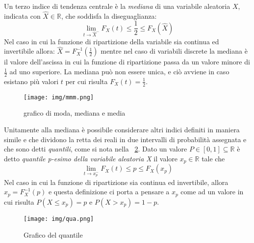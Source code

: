 \documentclass[a4paper,12pt, oneside]{book}
\newcommand{\numberset}{\mathbb}
\newcommand{\R}{\numberset{R}}
\begin{document}
Un terzo indice di tendenza centrale è la \emph{mediana}  di una variabile aleatoria $X$, 
indicata con $\hat{X} \in \R$, che soddisfa la diseguaglianza:
\[ \lim_{t \to \hat{X}^-} F_X(t) \leq \frac{1}{2} \leq F_X(\hat{X})\]
Nel caso in cui la funzione di ripartizione della variabile sia continua ed invertibile allora:
$\hat{X}=F_X^{-1}(\frac{1}{2})$ mentre nel caso di variabili discrete la mediana è il valore dell'ascissa
in cui la funzione di ripartizione passa da un valore minore di $\frac{1}{2}$ ad uno superiore.\newline
La mediana può non essere unica, e ciò avviene in caso esistano più valori $t$ per cui risulta $F_X(t) = \frac{1}{2}$.

\begin{figure}
    \centering
    \caption{grafico di moda, mediana e media}
    \label{fig:centralValue}
    \texttt{[image: img/mmm.png]}
\end{figure}
Unitamente alla mediana è possibile considerare altri indici definiti in maniera simile e che dividono
la retta dei reali in due intervalli di probabilità assegnata e che sono detti \emph{quantili}, come si nota
nella \figurename~\ref{fig:quantile}.
Dato un valore $P \in [0,1] \subseteq \R$ è detto \emph{quantile p-esimo della variabile aleatoria X} il valore
$x_p \in \R$ tale che
\[ \lim_{t \to x_p^{-}} F_X(t) \leq p \leq F_X(x_p)\]
Nel caso in cui la funzione di ripartizione sia continua ed invertibile, allora $x_p = F_X^{-1}(p)$
e questa definizione ci porta a pensare a $x_p$ come ad un valore in cui risulta 
$P(X \leq x_p) = p$ e $P(X > x_p) = 1-p$.

\begin{figure}
    \centering
    \caption{Grafico del quantile}
    \label{fig:quantile}
    \texttt{[image: img/qua.png]}
\end{figure}
\end{document}
